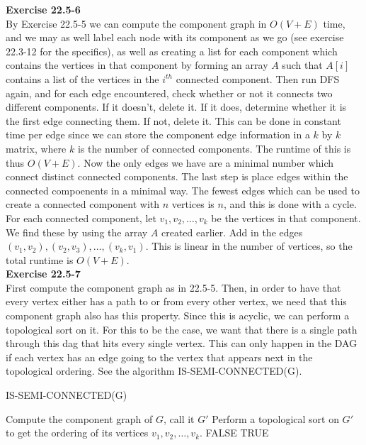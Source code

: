 \documentclass{article}
\begin{document}
\noindent\textbf{Exercise 22.5-6}\\

By Exercise 22.5-5 we can compute the component graph in $O(V+E)$ time, and we may as well label each node with its component as we go (see exercise 22.3-12 for the specifics), as well as creating a list for each component which contains the vertices in that component by forming an array $A$ such that $A[i]$ contains a list of the vertices in the $i^{th}$ connected component.  Then run DFS again, and for each edge encountered, check whether or not it connects two different components.  If it doesn't, delete it.  If it does, determine whether it is the first edge connecting them.  If not, delete it.  This can be done in constant time per edge since we can store the component edge information in a $k$ by $k$ matrix, where $k$ is the number of connected components.  The runtime of this is thus $O(V+E)$.  Now the only edges we have are a minimal number which connect distinct connected components. The last step is place edges within the connected compoenents in a minimal way.  The fewest edges which can be used to create a connected component with $n$ vertices is $n$, and this is done with a cycle. For each connected component, let $v_1, v_2, \ldots, v_k$ be the vertices in that component.  We find these by using the array $A$ created earlier.  Add in the edges $(v_1, v_2), (v_2,v_3), \ldots, (v_k, v_1)$. This is linear in the number of vertices, so the total runtime is $O(V+E)$.\\

\noindent\textbf{Exercise 22.5-7}\\ 

First compute the component graph as in 22.5-5. Then, in order to have that every vertex either has a path to or from every other vertex, we need that this component graph also has this property. Since this is acyclic, we can perform a topological sort on it. For this to be the case, we want that there is a single path through this dag that hits every single vertex. This can only happen in the DAG if each vertex has an edge going to the vertex that appears next in the topological ordering. See the algorithm IS-SEMI-CONNECTED(G).\\

\begin{algorithm}
\caption{IS-SEMI-CONNECTED(G)}
\begin{algorithmic}
\State Compute the component graph of $G$, call it $G'$
\State Perform a topological sort on $G'$ to get the ordering of its vertices $v_1,v_2, \ldots, v_k$.
\State \Return FALSE
\EndIf
\EndFor
\State \Return TRUE
\end{algorithmic}
\end{algorithm}
\end{document}

